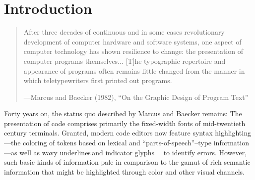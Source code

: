 \documentclass[acmsmall, screen]{acmart}
\newcommand{\inlineFig}[1]{\begingroup\normalfont
\raisebox{-0.01in}{\texttt{[image: \#1]}}
  \endgroup
}
\begin{document}








\maketitle

\section{Introduction}
\label{sec:intro}



\begin{quote}

After three decades of continuous and in
some cases revolutionary development of
computer hardware and software systems,
one aspect of computer technology has
shown resilience to change: the presentation
of computer programs themselves...
[T]he typographic repertoire and appearance
of programs often remains little changed
from the manner in which teletypewriters
first printed out programs.

\begin{flushright}







---Marcus and Baecker (1982),
``On the Graphic Design of Program Text''~\citep{Marcus1982}

\end{flushright}

\end{quote}

\vspace{0.10in} 

Forty years on, the status quo described by Marcus and Baecker remains: The presentation of code comprises primarily the fixed-width fonts of mid-twentieth century terminals.
Granted, modern code editors now feature syntax highlighting---the coloring of tokens based on lexical and ``parts-of-speech''--type information---as well as wavy underlines\,\raisebox{-0.024in}{\inlineFig{images/editor-squiggles-like-this}}and indicator glyphs~\inlineFig{images/editor-red-circle-indicator}~to identify errors.
However, such basic kinds of information pale in comparison to the gamut of rich semantic information that might be highlighted through color and other visual channels.
\end{document}
